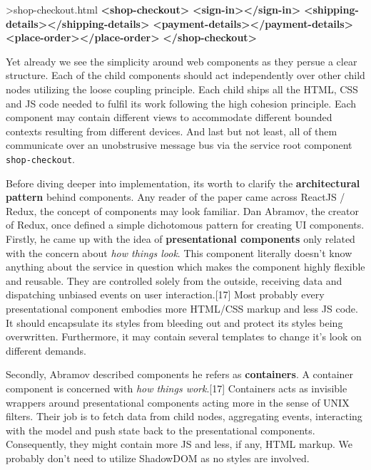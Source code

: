 \documentclass[]{article}
\newenvironment{Shaded}{}{}
\newcommand{\KeywordTok}[1]{\textcolor[rgb]{0.00,0.44,0.13}{\textbf{{#1}}}}
\newcommand{\NormalTok}[1]{{#1}}
\begin{document}
\begin{Shaded}
\begin{Highlighting}[]
\NormalTok{>shop-checkout.html}
\KeywordTok{<shop-checkout>}
  \KeywordTok{<sign-in></sign-in>}
  \KeywordTok{<shipping-details></shipping-details>}
  \KeywordTok{<payment-details></payment-details>}
  \KeywordTok{<place-order></place-order>}
\KeywordTok{</shop-checkout>}
\end{Highlighting}
\end{Shaded}

Yet already we see the simplicity around web components as they persue a
clear structure. Each of the child components should act independently
over other child nodes utilizing the loose coupling principle. Each
child ships all the HTML, CSS and JS code needed to fulfil its work
following the high cohesion principle. Each component may contain
different views to accommodate different bounded contexts resulting from
different devices. And last but not least, all of them communicate over
an unobstrusive message bus via the service root component
\texttt{shop-checkout}.

Before diving deeper into implementation, its worth to clarify the
\textbf{architectural pattern} behind components. Any reader of the
paper came across ReactJS / Redux, the concept of components may look
familiar. Dan Abramov, the creator of Redux, once defined a simple
dichotomous pattern for creating UI components. Firstly, he came up with
the idea of \textbf{presentational components} only related with the
concern about \emph{how things look}. This component literally doesn't
know anything about the service in question which makes the component
highly flexible and reusable. They are controlled solely from the
outside, receiving data and dispatching unbiased events on user
interaction.{[}17{]} Most probably every presentational component
embodies more HTML/CSS markup and less JS code. It should encapsulate
its styles from bleeding out and protect its styles being overwritten.
Furthermore, it may contain several templates to change it's look on
different demands.

Secondly, Abramov described components he refers as \textbf{containers}.
A container component is concerned with \emph{how things work}.{[}17{]}
Containers acts as invisible wrappers around presentational components
acting more in the sense of UNIX filters. Their job is to fetch data
from child nodes, aggregating events, interacting with the model and
push state back to the presentational components. Consequently, they
might contain more JS and less, if any, HTML markup. We probably don't
need to utilize ShadowDOM as no styles are involved.
\end{document}
